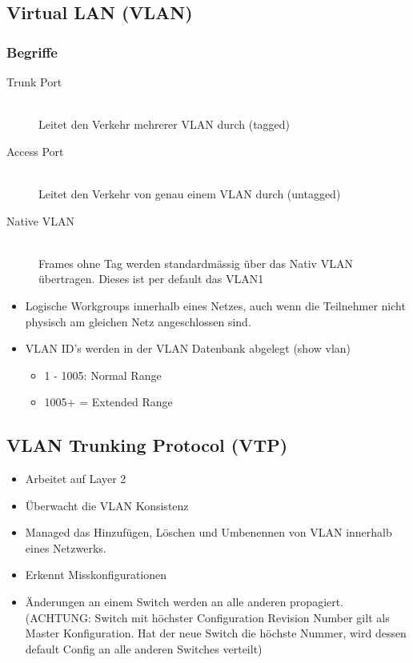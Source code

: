 \subsection{Virtual LAN (VLAN)}
\subsubsection{Begriffe}
\begin{description}
	\item[Trunk Port]\hfill \\ 
	Leitet den Verkehr mehrerer VLAN durch (tagged)
	\item[Access Port] \hfill \\
	Leitet den Verkehr von genau einem VLAN durch (untagged)
	\item[Native VLAN] \hfill \\
	Frames ohne Tag werden standardmässig über das Nativ VLAN übertragen. Dieses ist per default das VLAN1
	
\end{description}
\begin{itemize}
	\item Logische Workgroups innerhalb eines Netzes, auch wenn die Teilnehmer nicht physisch am gleichen Netz angeschlossen sind.
	\item VLAN ID's werden in der VLAN Datenbank abgelegt (show vlan)
	\begin{itemize}
		\item 1 - 1005: Normal Range
		\item 1005+ = Extended Range
	\end{itemize}
\end{itemize}

\subsection{VLAN Trunking Protocol (VTP)}
\begin{itemize}
	\item Arbeitet auf Layer 2
	\item Überwacht die VLAN Konsistenz
	\item Managed das Hinzufügen, Löschen und Umbenennen von VLAN innerhalb eines Netzwerks.
	\item Erkennt Misskonfigurationen
	\item Änderungen an einem Switch werden an alle anderen propagiert. (ACHTUNG: Switch mit höchster Configuration Revision Number gilt als Master Konfiguration. Hat der neue Switch die höchste Nummer, wird dessen default Config an alle anderen Switches verteilt)
\end{itemize}

